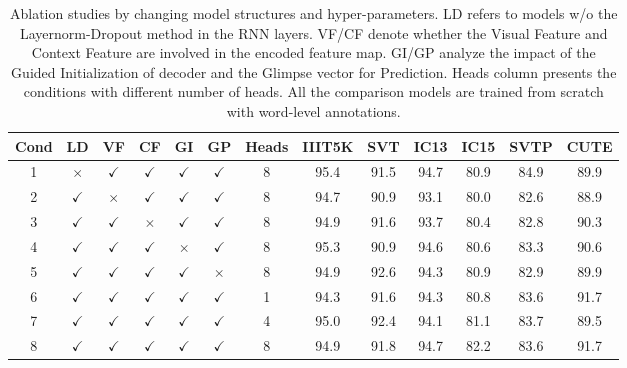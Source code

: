 \documentclass[runningheads]{llncs}
\begin{document}
\begin{table}[]
\vspace{-0.3cm} 
\caption{Ablation studies by changing model structures and hyper-parameters.  LD refers to models w/o the Layernorm-Dropout method in the RNN layers. VF/CF denote whether the Visual Feature and Context Feature are involved in the encoded feature map. GI/GP analyze the impact of the Guided Initialization of decoder and the Glimpse vector for Prediction. Heads column presents the conditions with different number of heads. All the comparison models are trained from scratch with word-level annotations.}
\label{tab3}
\centering
\begin{tabular}{|c|c|c|c|c|c|c|c|c|c|c|c|c|}
\hline
\textbf{Cond} & \textbf{LD} & \textbf{VF} & \textbf{CF} & \textbf{GI} & \textbf{GP} & \textbf{Heads} & \textbf{IIIT5K} & \textbf{SVT} & \textbf{IC13} & \textbf{IC15} & \textbf{SVTP} & \textbf{CUTE} \\ \hline
1             & $\times$                & $\checkmark$    & $\checkmark$       & $\checkmark$           & $\checkmark$          & 8              & 95.4            & 91.5         & 94.7          & 80.9          & 84.9          & 89.9          \\
2             & $\checkmark$        & $\times$      & $\checkmark$   & $\checkmark$        & $\checkmark$          & 8              & 94.7            & 90.9         & 93.1        & 80.0            & 82.6          & 88.9          \\
3             & $\checkmark$        & $\checkmark$       & $\times$    & $\checkmark$       & $\checkmark$          & 8              & 94.9            & 91.6         & 93.7          & 80.4          & 82.8          & 90.3          \\
4       & $\checkmark$        & $\checkmark$        & $\checkmark$     & $\times$      &$\checkmark$           & 8              & 95.3            & 90.9         & 94.6          & 80.6          & 83.3          & 90.6          \\
5             & $\checkmark$        & $\checkmark$        & $\checkmark$     & $\checkmark$      & $\times$          & 8              & 94.9            & 92.6         & 94.3          & 80.9          & 82.9          & 89.9          \\
6             & $\checkmark$      & $\checkmark$       & $\checkmark$    & $\checkmark$       & $\checkmark$          & 1              &94.3                 &91.6              & 94.3              &  80.8             & 83.6              & 91.7              \\
7     & $\checkmark$      & $\checkmark$   & $\checkmark$     & $\checkmark$      & $\checkmark$          & 4              & 95.0              & 92.4         & 94.1          & 81.1          & 83.7          & 89.5          \\  \hline
8    & $\checkmark$      & $\checkmark$      & $\checkmark$  & $\checkmark$   & $\checkmark$          & 8             & 94.9            & 91.8       & 94.7          & 82.2         & 83.6         & 91.7        \\ \hline
\end{tabular}
\end{table}
\vspace{-0.5cm}
\end{document}
